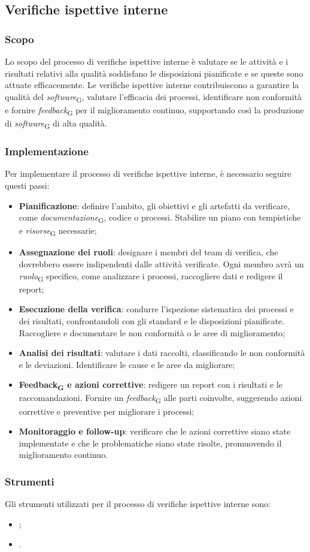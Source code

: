 \subsection{Verifiche ispettive interne}
\subsubsection{Scopo}
Lo scopo del processo di verifiche ispettive interne è valutare se le attività e i risultati relativi alla qualità soddisfano le disposizioni pianificate e se queste sono attuate efficacemente. Le verifiche ispettive interne contribuiscono a garantire la qualità del \textit{software}\textsubscript{G}, valutare l'efficacia dei processi, identificare non conformità e fornire \textit{feedback}\textsubscript{G} per il miglioramento continuo, supportando così la produzione di \textit{software}\textsubscript{G} di alta qualità.

\subsubsection{Implementazione}
Per implementare il processo di verifiche ispettive interne, è necessario seguire questi passi:
\begin{itemize}
    \item \textbf{Pianificazione}: definire l’ambito, gli obiettivi e gli artefatti da verificare, come \textit{documentazione}\textsubscript{G}, codice o processi. Stabilire un piano con tempistiche e \textit{risorse}\textsubscript{G} necessarie;
    \item \textbf{Assegnazione dei ruoli}: designare i membri del team di verifica, che dovrebbero essere indipendenti dalle attività verificate. Ogni membro avrà un \textit{ruolo}\textsubscript{G} specifico, come analizzare i processi, raccogliere dati e redigere il report;
    \item \textbf{Esecuzione della verifica}: condurre l'ispezione sistematica dei processi e dei risultati, confrontandoli con gli standard e le disposizioni pianificate. Raccogliere e documentare le non conformità o le aree di miglioramento;
    \item \textbf{Analisi dei risultati}: valutare i dati raccolti, classificando le non conformità e le deviazioni. Identificare le cause e le aree da migliorare;
    \item \textbf{Feedback\textsubscript{G} e azioni correttive}: redigere un report con i risultati e le raccomandazioni. Fornire un \textit{feedback}\textsubscript{G} alle parti coinvolte, suggerendo azioni correttive e preventive per migliorare i processi;
    \item \textbf{Monitoraggio e follow-up}: verificare che le azioni correttive siano state implementate e che le problematiche siano state risolte, promuovendo il miglioramento continuo.
\end{itemize}

\subsubsection{Strumenti}
Gli strumenti utilizzati per il processo di verifiche ispettive interne sono:
\begin{itemize}
    \item {};
    \item {}.
\end{itemize}